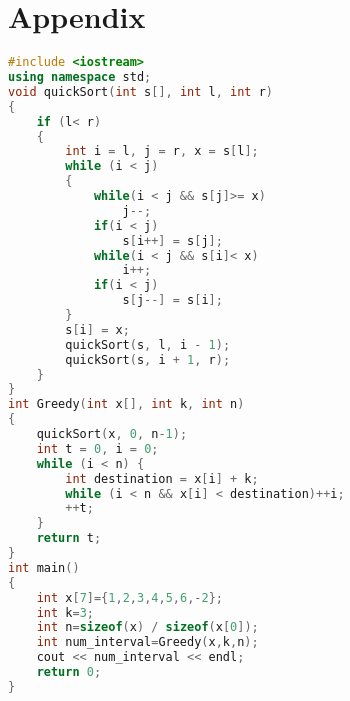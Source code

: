 \documentclass[12pt,a4paper]{article}
\theoremstyle{definition}
\begin{document}
\section{Appendix}
\begin{lstlisting}[language=C++]
#include <iostream>
using namespace std;
void quickSort(int s[], int l, int r)
{
    if (l< r)
    {
        int i = l, j = r, x = s[l];
        while (i < j)
        {
            while(i < j && s[j]>= x)
                j--;
            if(i < j)
                s[i++] = s[j];
            while(i < j && s[i]< x)
                i++;
            if(i < j)
                s[j--] = s[i];
        }
        s[i] = x;
        quickSort(s, l, i - 1);
        quickSort(s, i + 1, r);
    }
}
int Greedy(int x[], int k, int n)
{
    quickSort(x, 0, n-1);
    int t = 0, i = 0;
    while (i < n) {
        int destination = x[i] + k;
        while (i < n && x[i] < destination)++i;
        ++t;
    }
    return t;
}
int main()
{
    int x[7]={1,2,3,4,5,6,-2};
    int k=3;
    int n=sizeof(x) / sizeof(x[0]);
    int num_interval=Greedy(x,k,n);
    cout << num_interval << endl;
    return 0;
}

\end{lstlisting}

\end{document}
